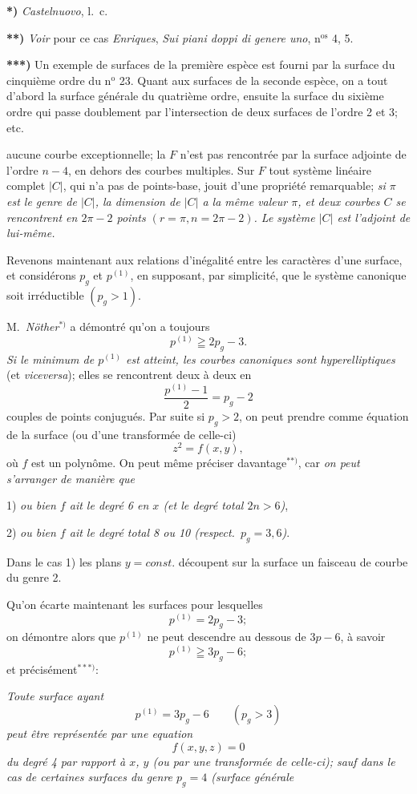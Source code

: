 \documentclass{article}
\begin{document}
\textbf{*)} \emph{Castelnuovo}, l.\ c.

\textbf{**)} \emph{Voir} pour ce cas \emph{Enriques}, \emph{Sui piani doppi di genere uno}, n${}^{\text{os}}$ 4, 5.

\textbf{***)} Un exemple de surfaces de la première espèce est fourni par la surface du cinquième ordre du n${}^{\text{o}}$ 23. Quant aux surfaces de la seconde espèce, on a tout d'abord la surface générale du quatrième ordre, ensuite la surface du sixième ordre qui passe doublement par l'intersection de deux surfaces de l'ordre 2 et 3; etc.

aucune courbe exceptionnelle; la $F$ n'est pas rencontrée par la surface adjointe de l'ordre $n-4$, en dehors des courbes multiples. Sur $F$ tout système linéaire complet $|C|$, qui n'a pas de points-base, jouit d'une propriété remarquable; \emph{si $\pi$ est le genre de $|C|$, la dimension de $|C|$ a la même valeur $\pi$, et deux courbes $C$ se rencontrent en $2\pi-2$ points $(r=\pi, n=2\pi-2)$. Le système $|C|$ est l'adjoint de lui-même.}

Revenons maintenant aux relations d'inégalité entre les caractères d'une surface, et considérons $p_{g}$ et $p^{(1)}$, en supposant, par simplicité, que le système canonique soit irréductible $(p_{g} > 1)$.

M.\ \emph{Nöther}${}^{*)}$ a démontré qu'on a toujours
\[ p^{(1)} \geqq 2p_{g} - 3. \]
\emph{Si le minimum de $p^{(1)}$ est atteint, les courbes canoniques sont hyperelliptiques} (et \emph{viceversa}); elles se rencontrent deux à deux en
\[ \frac{p^{(1)} - 1}{2} = p_{g} - 2 \]
couples de points conjugués. Par suite si $p_{g} > 2$, on peut prendre comme équation de la surface (ou d'une transformée de celle-ci)
\[ z^{2} = f(x, y), \]
où $f$ est un polynôme. On peut même préciser davantage${}^{**)}$, car \emph{on peut s'arranger de manière que}

1) \emph{ou bien $f$ ait le degré 6 en $x$ (et le degré total $2n > 6$)},

2) \emph{ou bien $f$ ait le degré total 8 ou 10 (respect.\ $p_{g} = 3, 6$)}.

Dans le cas 1) les plans $y = const.$ découpent sur la surface un faisceau de courbe du genre 2.

Qu'on écarte maintenant les surfaces pour lesquelles
\[ p^{(1)} = 2p_{g} - 3; \]
on démontre alors que $p^{(1)}$ ne peut descendre au dessous de $3p - 6$, à savoir
\[ p^{(1)} \geqq 3p_{g} - 6; \]
et précisément${}^{***)}$:

\emph{Toute surface ayant}
\[ p^{(1)} = 3p_{g} - 6 \qquad (p_{g} > 3) \]
\emph{peut être représentée par une equation}
\[ f(x, y, z) = 0 \]
\emph{du degré 4 par rapport à $x$, $y$ (ou par une transformée de celle-ci); sauf dans le cas de certaines surfaces du genre $p_{g} = 4$ (surface générale}
\end{document}

